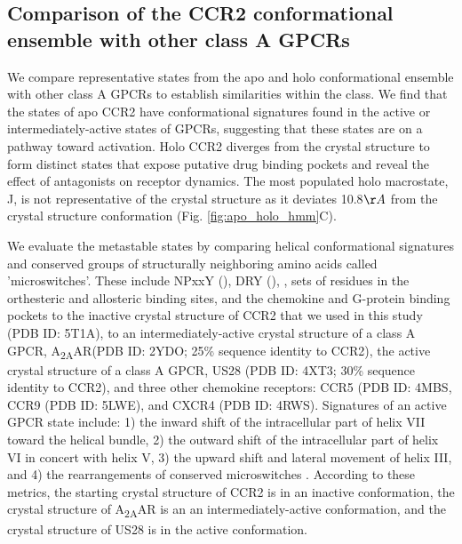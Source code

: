 \subsection{Comparison of the CCR2 conformational ensemble with other class A GPCRs}

We compare representative states from the apo and holo conformational ensemble with other class A GPCRs to establish similarities within the class.
We find that the states of apo CCR2 have conformational signatures found in the active or intermediately-active states of GPCRs, suggesting that these states are on a pathway toward activation.
Holo CCR2 diverges from the crystal structure to form distinct states that expose putative drug binding pockets and reveal the effect of antagonists on receptor dynamics. The most populated holo macrostate, J, is not representative of the crystal structure as it deviates 10.8$\AA$ from the crystal structure conformation (Fig. \ref{fig:apo_holo_hmm}C).

We evaluate the metastable states by comparing helical conformational signatures and conserved groups of structurally neighboring amino acids called 'microswitches'.
These include NPxxY (), DRY (), , sets of residues in the orthesteric and allosteric binding sites, and the chemokine and G-protein binding pockets to the inactive crystal structure of CCR2 that we used in this study (PDB ID: 5T1A), to an intermediately-active crystal structure of a class A GPCR, A\textsubscript{2A}AR(PDB ID: 2YDO\cite{Lebon2011}; 25\% sequence identity to CCR2), the active crystal structure of a class A GPCR, US28 (PDB ID: 4XT3\cite{Burg2015}; 30\% sequence identity to CCR2), and three other chemokine receptors: CCR5 (PDB ID: 4MBS\cite{Tan2013}, CCR9 (PDB ID: 5LWE\cite{Oswald2016}), and CXCR4 (PDB ID: 4RWS\cite{Qin2015}).
Signatures of an active GPCR state include:
1) the inward shift of the intracellular part of helix VII toward the helical bundle,
2) the outward shift of the intracellular part of helix VI in concert with helix V,
3) the upward shift and lateral movement of helix III,
and 4) the rearrangements of conserved microswitches \cite{Katritch2013}.
According to these metrics, the starting crystal structure of CCR2 is in an inactive conformation\cite{Zheng2016}, the crystal structure of A\textsubscript{2A}AR is an an intermediately-active conformation, and the crystal structure of US28 is in the active conformation.

